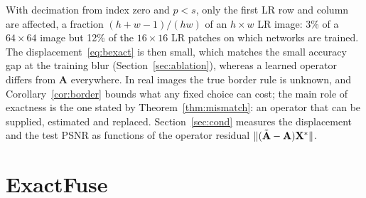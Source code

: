 \documentclass[journal]{IEEEtran}
\begin{document}
With decimation from index zero and $p<s$, only the first LR row and column are affected, a fraction $(h+w-1)/(hw)$ of an $h\times w$ LR image: 3\% of a $64\times64$ image but 12\% of the $16\times16$ LR patches on which networks are trained. The displacement~\eqref{eq:bexact} is then small, which matches the small accuracy gap at the training blur (Section~\ref{sec:ablation}), whereas a learned operator differs from $\mathbf{A}$ everywhere. In real images the true border rule is unknown, and Corollary~\ref{cor:border} bounds what any fixed choice can cost; the main role of exactness is the one stated by Theorem~\ref{thm:mismatch}: an operator that can be supplied, estimated and replaced. Section~\ref{sec:cond} measures the displacement and the test PSNR as functions of the operator residual $\|(\tilde{\mathbf{A}}-\mathbf{A})\mathbf{X}^*\|$.

\section{ExactFuse}
\label{sec:method}

\end{document}

